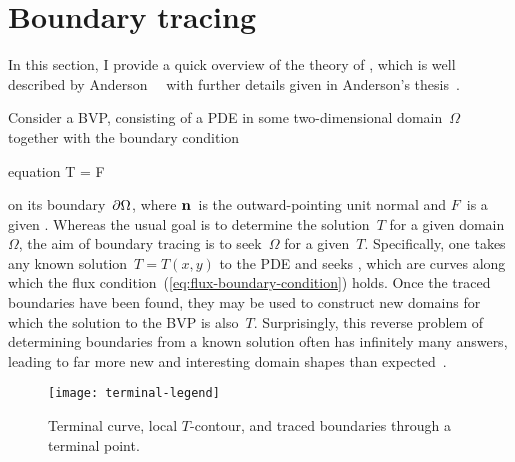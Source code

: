 \section{Boundary tracing}
\label{sec:introduction.tracing}

In this section, I provide a quick overview of
the theory of ,
which is well described by
Anderson~\etal~\cite{anderson-2007-boundary-tracing-i-theory}
with further details given in
Anderson's thesis~\cite{anderson-2002-thesis-boundary-tracing-pdes}.

Consider a BVP\@, consisting of
a PDE in some two-dimensional domain~$\Omega$
together with the boundary condition
\begin{important}{equation}
  \normalvec \dotp \del T = F 
  \label{eq:flux-boundary-condition}
\end{important}
on its boundary~$\mathop{}\!\partial\Omega$,
where $\mathop{}\!\boldsymbol{\mathbf{n}}$~is the outward-pointing unit normal
and $F$~is a given .
Whereas the usual goal is
to determine the solution~$T$ for a given domain~$\Omega$,
the aim of boundary tracing is
to seek~$\Omega$ for a given~$T$.
Specifically, one takes any known solution~$T = T (x, y)$ to the PDE
and seeks , which are curves
along which the flux condition~(\ref{eq:flux-boundary-condition}) holds.
Once the traced boundaries have been found,
they may be used to construct new domains
for which the solution to the BVP is also~$T$.
Surprisingly, this reverse problem
of determining boundaries from a known solution
often has infinitely many answers,
leading to far more new and interesting domain shapes
than expected~\cite{anderson-2007-boundary-tracing-ii-applications}.

\begin{figure}
  \newcommand*{\subfigurewidth}{0.325\textwidth}
  \centering
  \texttt{[image: terminal-legend]}
  \begin{subfigure}{\subfigurewidth}
  \end{subfigure}
  \hfill
  \begin{subfigure}{\subfigurewidth}
  \end{subfigure}
  \hfill
  \begin{subfigure}{\subfigurewidth}
  \end{subfigure}
  \caption{
    Terminal curve, local $T$-contour, and traced boundaries
    through a terminal point.
  }
  \label{fig:terminal}
\end{figure}

